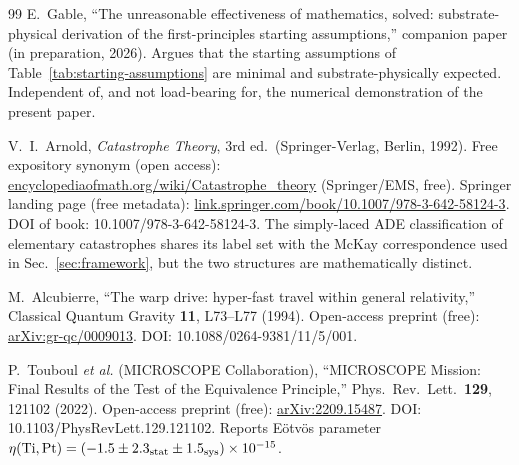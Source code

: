 ﻿\documentclass[reprint,amsmath,amssymb,aps,prd,longbibliography,floatfix]{revtex4-2}
\begin{document}
\begin{thebibliography}{99}
 E.~Gable,
``The unreasonable effectiveness of mathematics, solved:
substrate-physical derivation of the first-principles starting
assumptions,'' companion paper (in preparation, 2026).
Argues that the starting assumptions of
Table~\ref{tab:starting-assumptions} are minimal and substrate-physically
expected. Independent of, and not load-bearing for, the numerical
demonstration of the present paper.

 V.~I.~Arnold,
\textit{Catastrophe Theory}, 3rd ed.\
(Springer-Verlag, Berlin, 1992).
Free expository synonym (open access):
\href{https://encyclopediaofmath.org/wiki/Catastrophe_theory}{encyclopediaofmath.org/wiki/Catastrophe\_theory} (Springer/EMS, free).
Springer landing page (free metadata):
\href{https://link.springer.com/book/10.1007/978-3-642-58124-3}{link.springer.com/book/10.1007/978-3-642-58124-3}.
DOI of book: 10.1007/978-3-642-58124-3.
The simply-laced ADE classification of elementary catastrophes
shares its label set with the McKay correspondence used in
Sec.~\ref{sec:framework}, but the two structures are mathematically distinct.

 M.~Alcubierre,
``The warp drive: hyper-fast travel within general relativity,''
Classical Quantum Gravity \textbf{11}, L73--L77 (1994).
Open-access preprint (free): \href{https://arxiv.org/abs/gr-qc/0009013}{arXiv:gr-qc/0009013}.
DOI: 10.1088/0264-9381/11/5/001.

 P.~Touboul \textit{et al.} (MICROSCOPE Collaboration),
``MICROSCOPE Mission: Final Results of the Test of the Equivalence Principle,''
Phys.\ Rev.\ Lett.\ \textbf{129}, 121102 (2022).
Open-access preprint (free): \href{https://arxiv.org/abs/2209.15487}{arXiv:2209.15487}.
DOI: 10.1103/PhysRevLett.129.121102.
Reports E\"otv\"os parameter $\eta(\text{Ti},\text{Pt}) = (-1.5 \pm 2.3_{\rm stat} \pm 1.5_{\rm sys}) \times 10^{-15}$.

\end{thebibliography}
\end{document}
